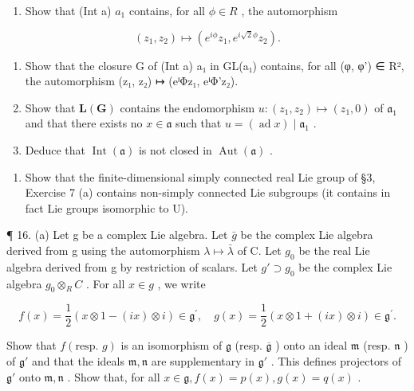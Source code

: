 \begin{enumerate}
\def\labelenumi{(\alph{enumi})}
\tightlist
\item
  Show that (Int a) \textbar{} \(a_{1}\) contains, for all \(\phi \in R\) , the automorphism
\end{enumerate}

\[
\left(z _ {1}, z _ {2}\right) \mapsto \left(e ^ {i \phi} z _ {1}, e ^ {i \sqrt {2} \phi} z _ {2}\right).
\]

\begin{enumerate}
\def\labelenumi{(\alph{enumi})}
\setcounter{enumi}{1}
\item
  Show that the closure G of (Int a) \textbar{} a₁ in GL(a₁) contains, for all (φ, φ') ∈ R², the automorphism (z₁, z₂) ↦ (eⁱΦz₁, eⁱΦ'z₂).
\item
  Show that \(\mathbf{L}(\mathbf{G})\) contains the endomorphism \(u: (z_1, z_2) \mapsto (z_1, 0)\) of \(\mathfrak{a}_1\) and that there exists no \(x \in \mathfrak{a}\) such that \(u = (\operatorname{ad} x) \mid \mathfrak{a}_1\) .
\item
  Deduce that \(\operatorname{Int}(\mathfrak{a})\) is not closed in \(\operatorname{Aut}(\mathfrak{a})\) .
\end{enumerate}

\begin{enumerate}
\def\labelenumi{\arabic{enumi}.}
\setcounter{enumi}{14}
\tightlist
\item
  Show that the finite-dimensional simply connected real Lie group of §3, Exercise 7 (a) contains non-simply connected Lie subgroups (it contains in fact Lie groups isomorphic to U).
\end{enumerate}

  ¶ 16. (a) Let g be a complex Lie algebra. Let \(\bar{g}\) be the complex Lie algebra derived from g using the automorphism \(\lambda \mapsto \bar{\lambda}\) of C. Let \(g_0\) be the real Lie algebra
derived from g by restriction of scalars. Let \(g' \supset g_0\) be the complex Lie algebra \(g_0 \otimes_{R} C\) . For all \(x \in g\) , we write

\[
f (x) = \frac {1}{2} (x \otimes 1 - (i x) \otimes i) \in \mathfrak {g} ^ {\prime}, \quad g (x) = \frac {1}{2} (x \otimes 1 + (i x) \otimes i) \in \mathfrak {g} ^ {\prime}.
\]

Show that \(f(\text{resp. } g)\) is an isomorphism of \(\mathfrak{g}\) (resp. \(\overline{\mathfrak{g}}\) ) onto an ideal \(\mathfrak{m}\) (resp. \(\mathfrak{n}\) ) of \(\mathfrak{g}'\) and that the ideals \(\mathfrak{m}, \mathfrak{n}\) are supplementary in \(\mathfrak{g}'\) . This defines projectors of \(\mathfrak{g}'\) onto \(\mathfrak{m}, \mathfrak{n}\) . Show that, for all \(x \in \mathfrak{g}, f(x) = p(x), g(x) = q(x)\) .

